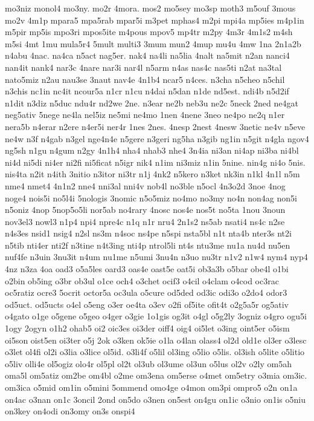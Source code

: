 {mo3niz
monol4
mo3ny.
mo2r
4mora.
mos2
mo5sey
mo3sp
moth3
m5ouf
3mous
mo2v
4m1p
mpara5
mpa5rab
mpar5i
m3pet
mphas4
m2pi
mpi4a
mp5ies
m4p1in
m5pir
mp5is
mpo3ri
mpos5ite
m4pous
mpov5
mp4tr
m2py
4m3r
4m1s2
m4sh
m5si
4mt
1mu
mula5r4
5mult
multi3
3mum
mun2
4mup
mu4u
4mw
1na
2n1a2b
n4abu
4nac.
na4ca
n5act
nag5er.
nak4
na4li
na5lia
4nalt
na5mit
n2an
nanci4
nan4it
nank4
nar3c
4nare
nar3i
nar4l
n5arm
n4as
nas4c
nas5ti
n2at
na3tal
nato5miz
n2au
nau3se
3naut
nav4e
4n1b4
ncar5
n4ces.
n3cha
n5cheo
n5chil
n3chis
nc1in
nc4it
ncour5a
n1cr
n1cu
n4dai
n5dan
n1de
nd5est.
ndi4b
n5d2if
n1dit
n3diz
n5duc
ndu4r
nd2we
2ne.
n3ear
ne2b
neb3u
ne2c
5neck
2ned
ne4gat
neg5ativ
5nege
ne4la
nel5iz
ne5mi
ne4mo
1nen
4nene
3neo
ne4po
ne2q
n1er
nera5b
n4erar
n2ere
n4er5i
ner4r
1nes
2nes.
4nesp
2nest
4nesw
3netic
ne4v
n5eve
ne4w
n3f
n4gab
n3gel
nge4n4e
n5gere
n3geri
ng5ha
n3gib
ng1in
n5git
n4gla
ngov4
ng5sh
n1gu
n4gum
n2gy
4n1h4
nha4
nhab3
nhe4
3n4ia
ni3an
ni4ap
ni3ba
ni4bl
ni4d
ni5di
ni4er
ni2fi
ni5ficat
n5igr
nik4
n1im
ni3miz
n1in
5nine.
nin4g
ni4o
5nis.
nis4ta
n2it
n4ith
3nitio
n3itor
ni3tr
n1j
4nk2
n5kero
n3ket
nk3in
n1kl
4n1l
n5m
nme4
nmet4
4n1n2
nne4
nni3al
nni4v
nob4l
no3ble
n5ocl
4n3o2d
3noe
4nog
noge4
nois5i
no5l4i
5nologis
3nomic
n5o5miz
no4mo
no3my
no4n
non4ag
non5i
n5oniz
4nop
5nop5o5li
nor5ab
no4rary
4nosc
nos4e
nos5t
no5ta
1nou
3noun
nov3el3
nowl3
n1p4
npi4
npre4c
n1q
n1r
nru4
2n1s2
ns5ab
nsati4
ns4c
n2se
n4s3es
nsid1
nsig4
n2sl
ns3m
n4soc
ns4pe
n5spi
nsta5bl
n1t
nta4b
nter3s
nt2i
n5tib
nti4er
nti2f
n3tine
n4t3ing
nti4p
ntrol5li
nt4s
ntu3me
nu1a
nu4d
nu5en
nuf4fe
n3uin
3nu3it
n4um
nu1me
n5umi
3nu4n
n3uo
nu3tr
n1v2
n1w4
nym4
nyp4
4nz
n3za
4oa
oad3
o5a5les
oard3
oas4e
oast5e
oat5i
ob3a3b
o5bar
obe4l
o1bi
o2bin
ob5ing
o3br
ob3ul
o1ce
och4
o3chet
ocif3
o4cil
o4clam
o4cod
oc3rac
oc5ratiz
ocre3
5ocrit
octor5a
oc3ula
o5cure
od5ded
od3ic
odi3o
o2do4
odor3
od5uct.
od5ucts
o4el
o5eng
o3er
oe4ta
o3ev
o2fi
of5ite
ofit4t
o2g5a5r
og5ativ
o4gato
o1ge
o5gene
o5geo
o4ger
o3gie
1o1gis
og3it
o4gl
o5g2ly
3ogniz
o4gro
ogu5i
1ogy
2ogyn
o1h2
ohab5
oi2
oic3es
oi3der
oiff4
oig4
oi5let
o3ing
oint5er
o5ism
oi5son
oist5en
oi3ter
o5j
2ok
o3ken
ok5ie
o1la
o4lan
olass4
ol2d
old1e
ol3er
o3lesc
o3let
ol4fi
ol2i
o3lia
o3lice
ol5id.
o3li4f
o5lil
ol3ing
o5lio
o5lis.
ol3ish
o5lite
o5litio
o5liv
olli4e
ol5ogiz
olo4r
ol5pl
ol2t
ol3ub
ol3ume
ol3un
o5lus
ol2v
o2ly
om5ah
oma5l
om5atiz
om2be
om4bl
o2me
om3ena
om5erse
o4met
om5etry
o3mia
om3ic.
om3ica
o5mid
om1in
o5mini
5ommend
omo4ge
o4mon
om3pi
ompro5
o2n
on1a
on4ac
o3nan
on1c
3oncil
2ond
on5do
o3nen
on5est
on4gu
on1ic
o3nio
on1is
o5niu
on3key
on4odi
on3omy
on3s
onspi4
}
